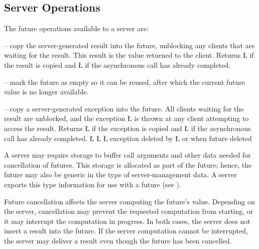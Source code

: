\documentclass[openright,twoside]{report}
\begin{document}
\subsection{Server Operations}
\label{s:ServerOperations}

The future operations available to a server are:
\begin{prefix}
\item[\LGinlinetrue\LGbegin\lgrinde\L{\LB{\V{delivery}(\0\V{T}\0\V{result}\0)}}\endlgrinde\LGend{}]
-- copy the server-generated result into the future, unblocking any clients that are waiting for the result.
This result is the value returned to the client.
Returns \LGinlinetrue\LGbegin\lgrinde\L{}\endlgrinde\LGend{} if the result is copied and \LGinlinetrue\LGbegin\lgrinde\L{}\endlgrinde\LGend{} if the asynchronous call has already completed.
\item[\LGinlinetrue\LGbegin\lgrinde\L{\LB{\V{reset}}}\endlgrinde\LGend{}]
-- mark the future as empty so it can be reused, after which the current future value is no longer available.
\item[\LGinlinetrue\LGbegin\lgrinde\L{\LB{\V{exception}(\0\V{uBaseEvent}\0\*\V{cause}\0)}}\endlgrinde\LGend{}]
-- copy a server-generated exception into the future.
All clients waiting for the result are unblocked, and the exception \LGinlinetrue\LGbegin\lgrinde\L{}\endlgrinde\LGend{} is thrown at any client attempting to access the result.
Returns \LGinlinetrue\LGbegin\lgrinde\L{}\endlgrinde\LGend{} if the exception is copied and \LGinlinetrue\LGbegin\lgrinde\L{}\endlgrinde\LGend{} if the asynchronous call has already completed.
\LGinlinefalse\LGbegin\lgrinde
\L{}
\L{}
\L{}
\CE{}\endlgrinde\LGend
exception deleted by \LGinlinetrue\LGbegin\lgrinde\L{}\endlgrinde\LGend{} or when future deleted
\end{prefix}

A server may require storage to buffer call arguments and other data needed for cancellation of futures.
This storage is allocated as part of the future;
hence, the future may also be generic in the type of server-management data.
A server exports this type information for use with a future (see ).

Future cancellation affects the server computing the future's value.
Depending on the server, cancellation may prevent the requested computation from starting, or it may interrupt the computation in progress.
In both cases, the server does not insert a result into the future.
If the server computation cannot be interrupted, the server may deliver a result even though the future has been cancelled.
\end{document}
